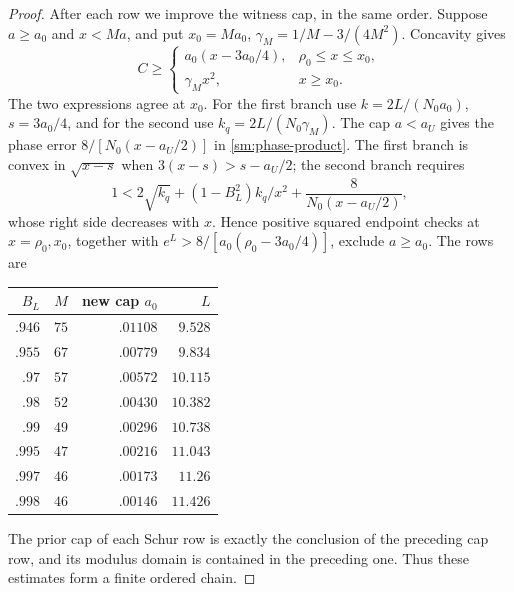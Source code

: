 \begin{proof}
After each row we improve the witness cap, in the same order.
Suppose $a\ge a_0$ and $x<Ma$, and put $x_0=Ma_0$,
$\gamma_M=1/M-3/(4M^2)$. Concavity gives
\begin{equation}\label{sm:joint-C}
 C\ge
 \begin{cases}
 a_0(x-3a_0/4),&\rho_0\le x\le x_0,\\
 \gamma_Mx^2,&x\ge x_0.
 \end{cases}
\end{equation}
The two expressions agree at $x_0$. For the first branch use
$k=2L/(N_0a_0)$, $s=3a_0/4$, and for the second use
$k_q=2L/(N_0\gamma_M)$. The cap $a<a_U$ gives
the phase error $8/[N_0(x-a_U/2)]$ in
\eqref{sm:phase-product}. The first branch is convex in
$\sqrt{x-s}$ when $3(x-s)>s-a_U/2$; the second branch requires
\[
 1<2\sqrt{k_q}+(1-B_L^2)k_q/x^2+\frac8{N_0(x-a_U/2)},
\]
whose right side decreases with $x$.
Hence positive squared endpoint checks at $x=\rho_0,x_0$, together
with $e^L>8/[a_0(\rho_0-3a_0/4)]$, exclude $a\ge a_0$.
The rows are
\begin{center}\small
\begin{tabular}{rrrr}
\toprule
$B_L$&$M$&new cap $a_0$&$L$\\\midrule
$.946$&$75$&$.01108$&$9.528$\\
$.955$&$67$&$.00779$&$9.834$\\
$.97$&$57$&$.00572$&$10.115$\\
$.98$&$52$&$.00430$&$10.382$\\
$.99$&$49$&$.00296$&$10.738$\\
$.995$&$47$&$.00216$&$11.043$\\
$.997$&$46$&$.00173$&$11.26$\\
$.998$&$46$&$.00146$&$11.426$\\\bottomrule
\end{tabular}
\end{center}
The prior cap of each Schur row is exactly the conclusion of the
preceding cap row, and its modulus domain is contained in the
preceding one. Thus these estimates form a finite ordered chain.


\end{proof}
